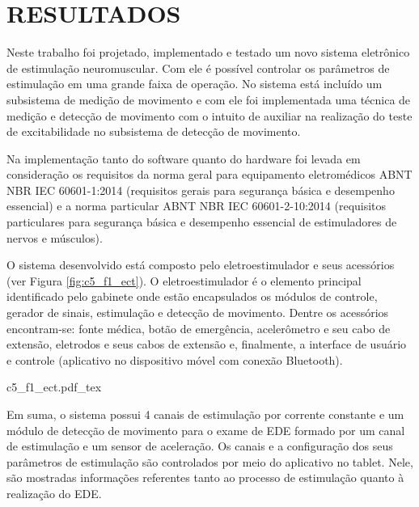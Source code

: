 \chapter{RESULTADOS} \label{sec:cap5}

Neste trabalho foi projetado, implementado e testado um novo sistema eletrônico de estimulação neuromuscular. Com ele é possível controlar os parâmetros de estimulação em uma grande faixa de operação. No sistema está incluído um subsistema de medição de movimento e com ele foi implementada uma técnica de medição e detecção de movimento com o intuito de auxiliar na realização do teste de excitabilidade no subsistema de detecção de movimento.

Na implementação tanto do software quanto do hardware foi levada em consideração os requisitos da norma geral para equipamento eletromédicos \acrshort{ABNT} \acrshort{NBR} \acrshort{IEC} 60601-1:2014 (requisitos gerais para segurança básica e desempenho essencial) e a norma particular \acrshort{ABNT} \acrshort{NBR} \acrshort{IEC} 60601-2-10:2014 (requisitos particulares para segurança básica e desempenho essencial de estimuladores de nervos e músculos).

O sistema desenvolvido está composto pelo eletroestimulador e seus acessórios (ver Figura \ref{fig:c5_f1_ect}). O eletroestimulador é o elemento principal identificado pelo gabinete onde estão encapsulados os módulos de controle, gerador de sinais, estimulação e detecção de movimento. Dentre os acessórios encontram-se: fonte médica, botão de emergência, acelerômetro e seu cabo de extensão, eletrodos e seus cabos de extensão e, finalmente, a interface de usuário e controle (aplicativo no dispositivo móvel  com conexão Bluetooth).

\vspace{0.3cm}

\begin{figure*}[h]
    \centering %
    \small %
    \def\svgwidth{1\columnwidth}%
    {c5_f1_ect.pdf_tex}
    \caption{Eletroestimulador com todos seus acessórios.}
    \label{fig:c5_f1_ect}
\end{figure*}

Em suma, o sistema possui 4 canais de estimulação por corrente constante e um módulo de detecção de movimento para o exame de EDE formado por um canal de estimulação e um sensor de aceleração. Os canais e a configuração dos seus parâmetros de estimulação são controlados por meio do aplicativo no tablet. Nele, são mostradas informações referentes tanto ao processo de estimulação quanto à realização do EDE.

